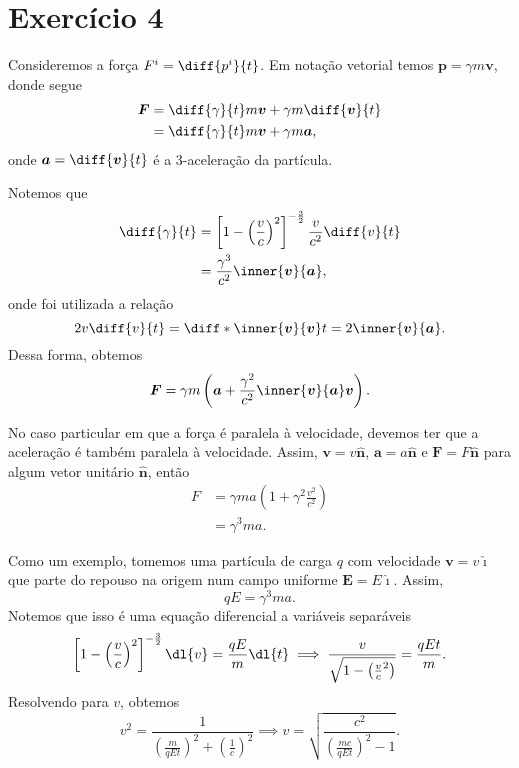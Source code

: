 \section*{Exercício 4}
Consideremos a força \(F^i = \diff{p^i}{t}\). Em notação vetorial temos \(\boldsymbol{p} = \gamma m \boldsymbol{v}\), donde segue
\begin{align*}
    \boldsymbol{F} &= \diff{\gamma}{t} m \boldsymbol{v} + \gamma m \diff{\boldsymbol{v}}{t}\\
            &= \diff{\gamma}{t}  m \boldsymbol{v} + \gamma m\boldsymbol{a},
\end{align*}
onde \(\boldsymbol{a} = \diff{\boldsymbol{v}}{t}\) é a 3-aceleração da partícula.

Notemos que
\begin{align*}
    \diff{\gamma}{t} &= \left[1 - \left(\frac{v}{c}\right)^2\right]^{-\frac32} \frac{v}{c^2}\diff{v}{t}\\
                     &= \frac{\gamma^3}{c^2} \inner{\boldsymbol{v}}{\boldsymbol{a}},
\end{align*}
onde foi utilizada a relação
\begin{equation*}
    2v\diff{v}{t} = \diff*{\inner{\boldsymbol{v}}{\boldsymbol{v}}}{t} = 2\inner{\boldsymbol{v}}{\boldsymbol{a}}.
\end{equation*}
Dessa forma, obtemos
\begin{equation*}
    \boldsymbol{F} = \gamma m \left(\boldsymbol{a} + \frac{\gamma^2}{c^2}\inner{\boldsymbol{v}}{\boldsymbol{a}}\boldsymbol{v}\right).
\end{equation*}

No caso particular em que a força é paralela à velocidade, devemos ter que a aceleração é também paralela à velocidade. Assim, \(\boldsymbol{v} = v \boldsymbol{\hat{n}}\), \(\boldsymbol{a} = a\boldsymbol{\hat{n}}\) e \(\boldsymbol{F} = F\boldsymbol{\hat{n}}\) para algum vetor unitário \(\boldsymbol{\hat{n}}\), então
\begin{align*}
    F &= \gamma ma \left(1 + \gamma^2\frac{v^2}{c^2}\right)\\
      &= \gamma^3 ma.
\end{align*}

Como um exemplo, tomemos uma partícula de carga \(q\) com velocidade \(\boldsymbol{v} = v\boldsymbol{\hat{\imath}}\) que parte do repouso na origem num campo uniforme \(\boldsymbol{E} = E\boldsymbol{\hat{\imath}}\). Assim,
\begin{equation*}
    qE = \gamma^3 ma.
\end{equation*}
Notemos que isso é uma equação diferencial a variáveis separáveis
\begin{equation*}
    \left[1 - \left(\frac{v}{c}\right)^2\right]^{-\frac32}\dl{v} = \frac{qE}{m} \dl{t} \implies \frac{v}{\sqrt{1 - \left(\frac{v}{c}^2\right)}} = \frac{qEt}{m}.
\end{equation*}
Resolvendo para \(v\), obtemos
\begin{equation*}
    v^2 = \frac{1}{\left(\frac{m}{qEt}\right)^2 + \left(\frac{1}{c}\right)^2} \implies v = \sqrt{\frac{c^2}{\left(\frac{mc}{qEt}\right)^2 - 1}}.
\end{equation*}

